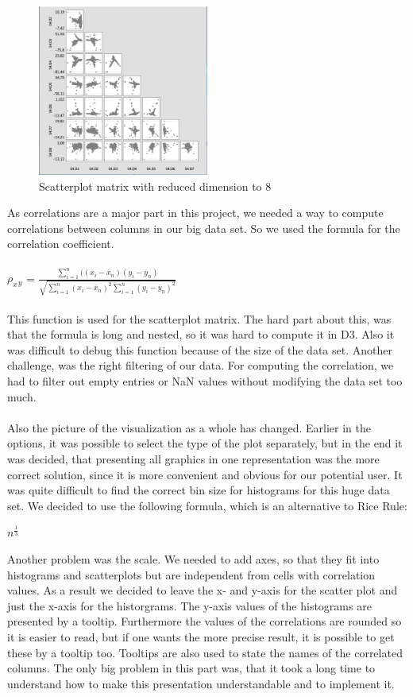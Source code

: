 \documentclass{vgtc}                          %
\begin{document}
\begin{figure}[H]
\includegraphics[width=0.5\textwidth]{splom.PNG}
\centering
\caption{Scatterplot matrix with reduced dimension to 8}
\end{figure}


As correlations are a major part in this project, we needed a way to compute correlations between columns in our big data set.
So we used the formula for the correlation coefficient.\cite{corr}
\\
\\
$\rho_x{}_y$ = $\frac{\sum_{i=1}^n ((x_i-\overline{x}_n)(y_i - \overline{y}_n)}{\sqrt{\sum_{i=1}^n (x_i - \overline{x}_n)^2\sum_{i=1}^n(y_i - \overline{y}_n)^2}}$
\\
\\
This function is used for the scatterplot matrix.
The hard part about this, was that the formula is long and nested, so it was hard to compute it in D3. Also it was difficult to debug this function because of the size of the data set. Another challenge, was the right filtering of our data. For computing the correlation, we had to filter out empty entries or NaN values without modifying the data set too much.
\\
\\
Also the picture of the visualization as a whole has changed. Earlier in the options, it was possible to select the type of the plot separately, but in the end it was decided, that presenting all graphics in one representation was the more correct solution, since it is more convenient and obvious for our potential user.
It was quite difficult to find the correct bin size for histograms for this huge data set. We decided to use the following formula, which is an alternative to Rice Rule:

$n^{\frac{1}{3}}$

Another problem was the scale. We needed to add axes, so that they fit into histograms and scatterplots but are independent from cells with correlation values. As a result we decided to leave the x- and y-axis for the scatter plot and just the x-axis for the historgrams. The y-axis values of the histograms are presented by a tooltip. Furthermore the values of the correlations are rounded so it is easier to read, but if one wants the more precise result, it is possible to get these by a tooltip too. Tooltips are also used to state the names of the correlated columns.
The only big problem in this part was, that it took a long time to understand how to make this presentation understandable and to implement it.
\end{document}
